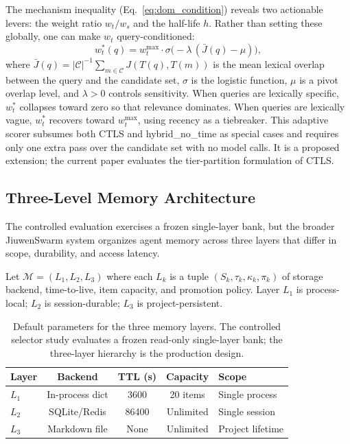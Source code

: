 The mechanism inequality (Eq.~\ref{eq:dom_condition}) reveals two actionable levers: the weight ratio $w_t/w_s$ and the half-life $h$. Rather than setting these globally, one can make $w_t$ query-conditioned:
\begin{equation}
  w_t^*(q) = w_t^{\max} \cdot \sigma\!\bigl(-\lambda\,(\bar{J}(q) - \mu)\bigr),
  \label{eq:adaptive_wt}
\end{equation}
where $\bar{J}(q) = |\mathcal{C}|^{-1}\!\sum_{m \in \mathcal{C}} J(T(q),T(m))$ is the mean lexical overlap between the query and the candidate set, $\sigma$ is the logistic function, $\mu$ is a pivot overlap level, and $\lambda > 0$ controls sensitivity. When queries are lexically specific, $w_t^*$ collapses toward zero so that relevance dominates. When queries are lexically vague, $w_t^*$ recovers toward $w_t^{\max}$, using recency as a tiebreaker. This adaptive scorer subsumes both CTLS and hybrid\_no\_time as special cases and requires only one extra pass over the candidate set with no model calls. It is a proposed extension; the current paper evaluates the tier-partition formulation of CTLS.

\subsection{Three-Level Memory Architecture}
\label{sec:method_architecture}

The controlled evaluation exercises a frozen single-layer bank, but the broader JiuwenSwarm system organizes agent memory across three layers that differ in scope, durability, and access latency.

\begin{definition}
Let $\mathcal{M} = (L_1, L_2, L_3)$ where each $L_k$ is a tuple $(S_k, \tau_k, \kappa_k, \pi_k)$ of storage backend, time-to-live, item capacity, and promotion policy. Layer $L_1$ is process-local; $L_2$ is session-durable; $L_3$ is project-persistent.
\end{definition}

\begin{table}[htbp]
\centering\small
\caption{Default parameters for the three memory layers. The controlled selector study evaluates a frozen read-only single-layer bank; the three-layer hierarchy is the production design.}
\label{tab:memory_layers}
\begin{tabular}{lcccl}\toprule
Layer & Backend & TTL (s) & Capacity & Scope \\\midrule
$L_1$ & In-process dict & 3600 & 20 items & Single process \\
$L_2$ & SQLite/Redis & 86400 & Unlimited & Single session \\
$L_3$ & Markdown file & None & Unlimited & Project lifetime \\
\bottomrule\end{tabular}
\end{table}

